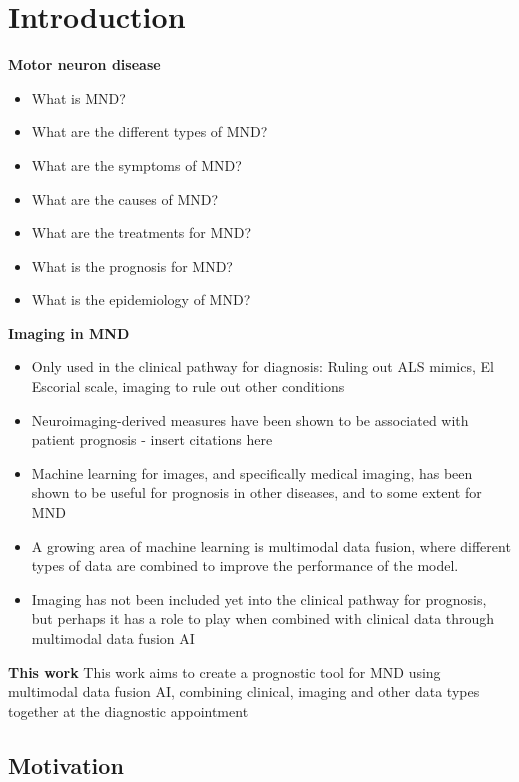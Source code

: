 \chapter{Introduction}
\label{introduction}

\textbf{Motor neuron disease}
\begin{itemize}
    \item What is MND?
    \item What are the different types of MND?
    \item What are the symptoms of MND?
    \item What are the causes of MND?
    \item What are the treatments for MND?
    \item What is the prognosis for MND?
    \item What is the epidemiology of MND?
\end{itemize}

\textbf{Imaging in MND}
\begin{itemize}
    \item Only used in the clinical pathway for diagnosis: Ruling out ALS mimics, El Escorial scale, imaging to rule out other conditions
    \item Neuroimaging-derived measures have been shown to be associated with patient prognosis - insert citations here
    \item Machine learning for images, and specifically medical imaging, has been shown to be useful for prognosis in other diseases, and to some extent for MND
    \item A growing area of machine learning is multimodal data fusion, where different types of data are combined to improve the performance of the model.
    \item Imaging has not been included yet into the clinical pathway for prognosis, but perhaps it has a role to play when combined with clinical data through multimodal data fusion AI
\end{itemize}

\textbf{This work}
This work aims to create a prognostic tool for MND using multimodal data fusion AI, combining clinical, imaging and other data types together at the diagnostic appointment


\section{Motivation}

